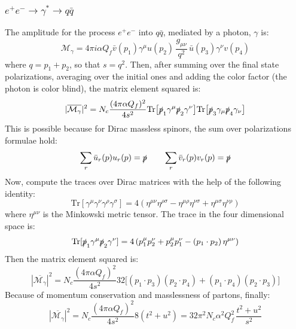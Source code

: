 \documentclass[]{article}
\begin{document}
\subsubsection{$e^+ e^- \rightarrow \gamma^* \rightarrow q \bar{q}$}
The amplitude for the process $e^+ e^-$ into $q \bar{q}$, mediated by a photon,
$\gamma$ is:
\begin{equation}
	\mathcal{M}_\gamma = 4 \pi i \alpha Q_f \bar{v}(p_1)\gamma^\mu u(p_2)\,
	\frac{g_{\mu\nu}}{q^2}\,\bar{u}(p_3)\gamma^\nu v(p_4)
\end{equation}
where $q = p_1+p_2$, so that $s=q^2$.
Then, after summing over the final state polarizations, averaging over the initial
ones and adding the color factor (the photon is color blind), the matrix element
squared is:
\begin{equation}
	|\overline{\mathcal{M}_\gamma}|^2 = N_c\frac{(4\pi\alpha Q_f)^2}{4s^2}
	\mathrm{Tr}\big[\slashed{p}_1 \gamma^\mu \slashed{p}_2 \gamma^\nu\big]
	\mathrm{Tr}\big[\slashed{p}_3 \gamma_\mu \slashed{p}_4 \gamma_\nu\big]
\end{equation}
This is possible because for Dirac massless spinors, the sum over polarizations
formulae hold:
\begin{equation}
\sum_r \bar{u}_r(p) u_r(p) = \slashed{p} \qquad\sum_r \bar{v}_r(p) v_r(p) = \slashed{p}
\end{equation}
Now, compute the traces over Dirac matrices with the help of the following identity:
\begin{equation}
\mathrm{Tr}[\gamma^\mu \gamma^\nu \gamma^\rho \gamma^\sigma] =
4(\eta^{\mu\nu}\eta^{\rho\sigma}-\eta^{\mu\rho}\eta^{\nu\sigma}+
\eta^{\mu\sigma}\eta^{\nu\rho})
\end{equation}
where $\eta^{\mu\nu}$ is the Minkowski metric tensor.
The trace in the four dimensional space is:
\begin{equation}
\mathrm{Tr}[\slashed{p}_1 \gamma^\mu \slashed{p}_2 \gamma^\nu] =
4\,(p_1^\mu p_2^\nu + p_2^\mu p_1^\nu - (p_1\cdot p_2)\,\eta^{\mu\nu})
\end{equation}
Then the matrix element squared is:
\begin{equation}
|\overline{\mathcal{M}_\gamma}|^2 = N_c \frac{(4\pi\alpha Q_f)^2}{4s^2} 32
\big[(p_1\cdot p_3)(p_2\cdot p_4) + (p_1\cdot p_4) (p_2\cdot p_3) \big]
\end{equation}
Because of momentum conservation and masslessness of partons, finally:
\begin{equation}
\label{melem_a}
|\overline{\mathcal{M}_\gamma}|^2 =
N_c\frac{(4\pi\alpha Q_f)^2}{4s^2} 8(t^2+u^2) =
32\pi^2 N_c\alpha^2 Q_f^2\,\frac{t^2+u^2}{s^2}
\end{equation}
\end{document}
